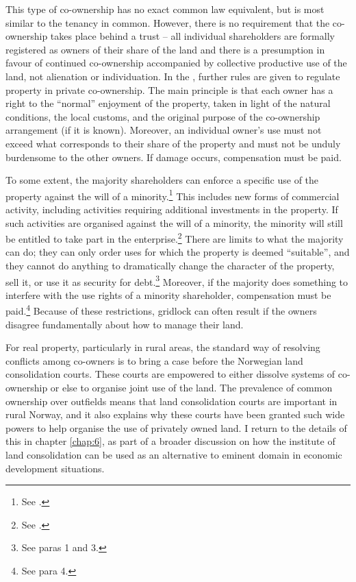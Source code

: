 This type of co-ownership has no exact common law equivalent, but is most similar to the tenancy in common. However, there is no requirement that the co-ownership takes place behind a trust -- all individual shareholders are formally registered as owners of their share of the land and there is a presumption in favour of continued co-ownership accompanied by collective productive use of the land, not alienation or individuation. In the \cite{coa65}, further rules are given to regulate property in private co-ownership. The main principle is that each owner has a right to the ``normal'' enjoyment of the property, taken in light of the natural conditions, the local customs, and the original purpose of the co-ownership arrangement (if it is known). Moreover, an individual owner's use must not exceed what corresponds to their share of the property and must not be unduly burdensome to the other owners. If damage occurs, compensation must be paid.

To some extent, the majority shareholders can enforce a specific use of the property against the will of a minority.\footnote{See \cite[4]{coa65}.} This includes new forms of commercial activity, including activities requiring additional investments in the property. If such activities are organised against the will of a minority, the minority will still be entitled to take part in the enterprise.\footnote{See \cite[5]{coa65}.} There are limits to what the majority can do; they can only order uses for which the property is deemed ``suitable'', and they cannot do anything to dramatically change the character of the property, sell it, or use it as security for debt.\footnote{See \cite[4]{coa65} paras 1 and 3.} Moreover, if the majority does something to interfere with the use rights of a minority shareholder, compensation must be paid.\footnote{See \cite[4]{coa65} para 4.} Because of these restrictions,  gridlock can often result if the owners disagree fundamentally about how to manage their land.

For real property, particularly in rural areas, the standard way of resolving conflicts among co-owners is to bring a case before the Norwegian land consolidation courts. These courts are empowered to either dissolve systems of co-ownership or else to organise joint use of the land. The prevalence of common ownership over outfields means that land consolidation courts are important in rural Norway, and it also explains why these courts have been granted such wide powers to help organise the use of privately owned land. I return to the details of this in chapter \ref{chap:6}, as part of a broader discussion on how the institute of land consolidation can be used as an alternative to eminent domain in economic development situations.

